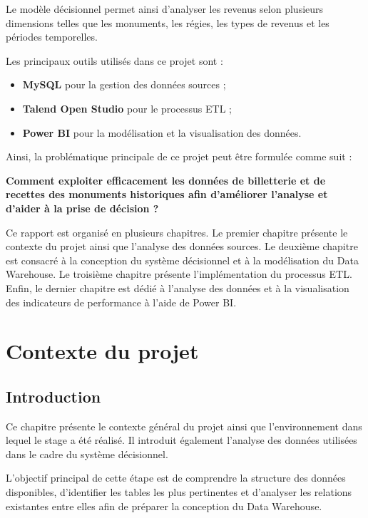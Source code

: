 \documentclass[12pt,a4paper]{report}
\begin{document}
	Le modèle décisionnel permet ainsi d’analyser les revenus selon plusieurs dimensions telles que les monuments, les régies, les types de revenus et les périodes temporelles.
	
	Les principaux outils utilisés dans ce projet sont :
	
	\begin{itemize}
		\item \textbf{MySQL} pour la gestion des données sources ;
		\item \textbf{Talend Open Studio} pour le processus ETL ;
		\item \textbf{Power BI} pour la modélisation et la visualisation des données.
	\end{itemize}
	
	Ainsi, la problématique principale de ce projet peut être formulée comme suit :
	
	\begin{center}
		\textbf{Comment exploiter efficacement les données de billetterie et de recettes des monuments historiques afin d’améliorer l’analyse et d’aider à la prise de décision ?}
	\end{center}
	
	Ce rapport est organisé en plusieurs chapitres. Le premier chapitre présente le contexte du projet ainsi que l’analyse des données sources. Le deuxième chapitre est consacré à la conception du système décisionnel et à la modélisation du Data Warehouse. Le troisième chapitre présente l’implémentation du processus ETL. Enfin, le dernier chapitre est dédié à l’analyse des données et à la visualisation des indicateurs de performance à l’aide de Power BI.
	
	
	\chapter{Contexte du projet}
	
	\section*{Introduction}
	
	Ce chapitre présente le contexte général du projet ainsi que l’environnement dans lequel le stage a été réalisé. Il introduit également l’analyse des données utilisées dans le cadre du système décisionnel.
	
	L’objectif principal de cette étape est de comprendre la structure des données disponibles, d’identifier les tables les plus pertinentes et d’analyser les relations existantes entre elles afin de préparer la conception du Data Warehouse.
	
\end{document}
